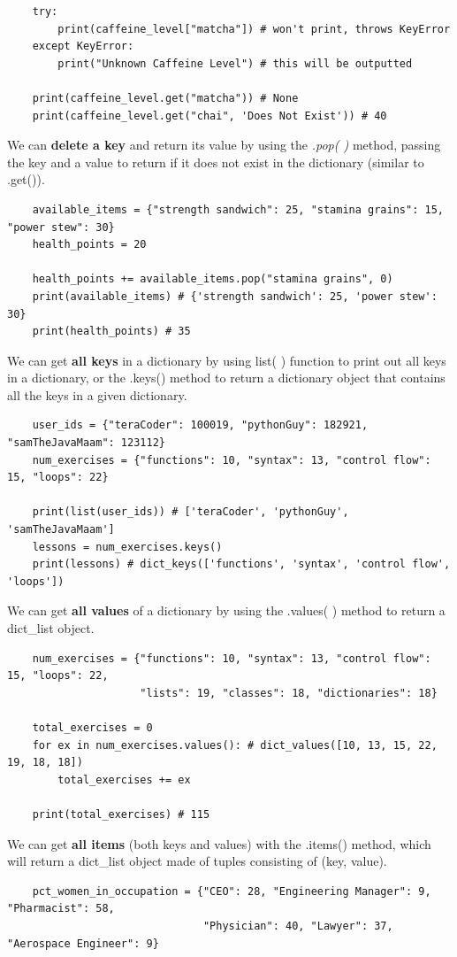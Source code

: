 \documentclass[11pt, a4paper]{article}
\begin{document}
\begin{spacing}{1.1}
\begin{lstlisting}
	try:
		print(caffeine_level["matcha"]) # won't print, throws KeyError 
	except KeyError:
		print("Unknown Caffeine Level") # this will be outputted 
	
	print(caffeine_level.get("matcha")) # None
	print(caffeine_level.get("chai", 'Does Not Exist')) # 40 \end{lstlisting}\vspace*{1mm}
	We can \textbf{delete a key} and return its value by using the \textit{.pop( )} method, passing the key and a value to return if it does not exist in the dictionary (similar to .get()).
	\begin{lstlisting}
	available_items = {"strength sandwich": 25, "stamina grains": 15, "power stew": 30}
	health_points = 20
	
	health_points += available_items.pop("stamina grains", 0)
	print(available_items) # {'strength sandwich': 25, 'power stew': 30}
	print(health_points) # 35 \end{lstlisting}\vspace*{1mm}
	We can get \textbf{all keys} in a dictionary by using list( ) function to print out all keys in a dictionary, or the .keys() method to return a dictionary object that contains all the keys in a given dictionary.
	\begin{lstlisting}
	user_ids = {"teraCoder": 100019, "pythonGuy": 182921, "samTheJavaMaam": 123112}
	num_exercises = {"functions": 10, "syntax": 13, "control flow": 15, "loops": 22}
	
	print(list(user_ids)) # ['teraCoder', 'pythonGuy', 'samTheJavaMaam']
	lessons = num_exercises.keys()
	print(lessons) # dict_keys(['functions', 'syntax', 'control flow', 'loops']) \end{lstlisting} \newpage
	\noindent We can get \textbf{all values} of a dictionary by using the .values( ) method to return a dict\_list object. 
	\begin{lstlisting}
	num_exercises = {"functions": 10, "syntax": 13, "control flow": 15, "loops": 22, 
	                 "lists": 19, "classes": 18, "dictionaries": 18}
	
	total_exercises = 0
	for ex in num_exercises.values(): # dict_values([10, 13, 15, 22, 19, 18, 18])
		total_exercises += ex
	
	print(total_exercises) # 115 \end{lstlisting}\vspace*{1mm}
	We can get \textbf{all items} (both keys and values) with the .items() method, which will return a dict\_list object made of tuples consisting of (key, value). 
	\begin{lstlisting}
	pct_women_in_occupation = {"CEO": 28, "Engineering Manager": 9, "Pharmacist": 58, 
	                           "Physician": 40, "Lawyer": 37, "Aerospace Engineer": 9}
	

\end{lstlisting}
\end{spacing}
\end{document}
